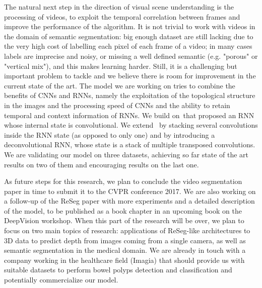 The natural next step in the direction of visual scene understanding is the
processing of videos, to exploit the temporal correlation between frames and
improve the performance of the algorithm. It is not trivial to work with videos
in the domain of semantic segmentation: big enough dataset are still lacking
due to the very high cost of labelling each pixel of each frame of a video; in
many cases labels are imprecise and noisy, or missing a well defined semantic
(e.g. "porous" or "vertical mix"), and this makes learning harder. Still, it is
a challenging but important problem to tackle and we believe there is room for
improvement in the current state of the art. The model we are working on tries
to combine the benefits of CNNs and RNNs, namely the exploitation of the
topological structure in the images and the processing speed of CNNs and the
ability to retain temporal and context information of RNNs. We build
on~\cite{xingjian2015convolutional}that proposed an RNN whose internal state is
convolutional. We extend~\cite{xingjian2015convolutional}  by stacking several
convolutions inside the RNN state (as opposed to only one) and by introducing a
deconvolutional RNN, whose state is a stack of multiple transposed
convolutions. We are validating our model on three datasets, achieving so far
state of the art results on two of them and encouraging results on the last
one.

As future steps for this research, we plan to conclude the video segmentation
paper in time to submit it to the CVPR conference 2017. We are also working on
a follow-up of the ReSeg paper with more experiments and a detailed description
of the model, to be published as a book chapter in an upcoming book on the
DeepVision workshop. When this part of the research will be over, we plan
to focus on two main topics of research: applications of ReSeg-like
architectures to 3D data to predict depth from images coming from a single
camera, as well as semantic segmentation in the medical domain. We are already
in touch with a company working in the healthcare field (Imagia) that should
provide us with suitable datasets to perform bowel polyps detection and
classification and potentially commercialize our model.
